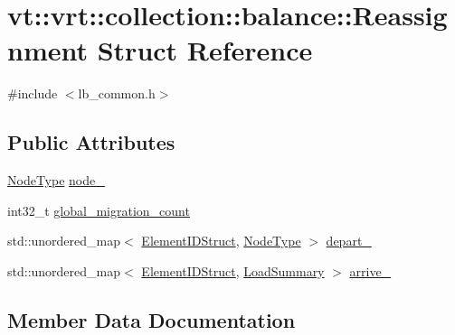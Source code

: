 \hypertarget{structvt_1_1vrt_1_1collection_1_1balance_1_1_reassignment}{}\section{vt\+:\+:vrt\+:\+:collection\+:\+:balance\+:\+:Reassignment Struct Reference}
\label{structvt_1_1vrt_1_1collection_1_1balance_1_1_reassignment}


{\ttfamily \#include $<$lb\+\_\+common.\+h$>$}

\subsection*{Public Attributes}
\begin{DoxyCompactItemize}
\item 
\hyperlink{namespacevt_a866da9d0efc19c0a1ce79e9e492f47e2}{Node\+Type} \hyperlink{structvt_1_1vrt_1_1collection_1_1balance_1_1_reassignment_ab94b05ac3a28d21a1f189f4becbe1240}{node\+\_\+}
\item 
int32\+\_\+t \hyperlink{structvt_1_1vrt_1_1collection_1_1balance_1_1_reassignment_a4887608a57a19a896481f22d2ad11ce2}{global\+\_\+migration\+\_\+count}
\item 
std\+::unordered\+\_\+map$<$ \hyperlink{namespacevt_1_1vrt_1_1collection_1_1balance_a9f5b53fafb270212279a4757d2c4cd28}{Element\+I\+D\+Struct}, \hyperlink{namespacevt_a866da9d0efc19c0a1ce79e9e492f47e2}{Node\+Type} $>$ \hyperlink{structvt_1_1vrt_1_1collection_1_1balance_1_1_reassignment_a8fa0e732209e0f186eb10a15b29a0914}{depart\+\_\+}
\item 
std\+::unordered\+\_\+map$<$ \hyperlink{namespacevt_1_1vrt_1_1collection_1_1balance_a9f5b53fafb270212279a4757d2c4cd28}{Element\+I\+D\+Struct}, \hyperlink{structvt_1_1vrt_1_1collection_1_1balance_1_1_load_summary}{Load\+Summary} $>$ \hyperlink{structvt_1_1vrt_1_1collection_1_1balance_1_1_reassignment_a990e74af25598838b67d2679c82a3eb1}{arrive\+\_\+}
\end{DoxyCompactItemize}


\subsection{Member Data Documentation}
\mbox{\label{structvt_1_1vrt_1_1collection_1_1balance_1_1_reassignment_a990e74af25598838b67d2679c82a3eb1}} 
